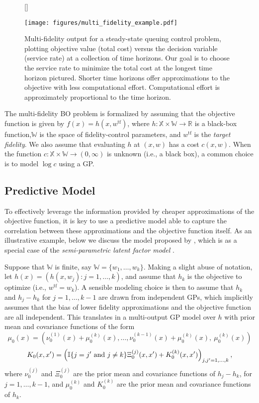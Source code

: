 \documentclass{wscpaperproc}
\newcommand{\R}{\mathbb{R}}
\newcommand{\X}{\mathbb{X}}
\newcommand{\W}{\mathbb{W}}
\theoremstyle{wsc}
\begin{document}
\begin{figure}[h]
[\FBwidth]
{\caption{
Multi-fidelity output for a steady-state queuing control problem, plotting objective value (total cost) versus the decision variable (service rate) at a collection of time horizons. Our goal is to choose the service rate to minimize the total cost at the longest time horizon pictured. Shorter time horizons offer approximations to the objective with less computational effort. Computational effort is approximately proportional to the time horizon.
\label{fig:mf_example}
}\label{fig:test}}
{\texttt{[image: figures/multi\_fidelity\_example.pdf]}}
\end{figure}

The multi-fidelity BO problem is formalized by assuming that the objective function is given by $f(x)=h(x,w^{\mathrm{tf}})$, where $h:\X\times\W\rightarrow\R$ is a black-box function,$\W$ is the space of fidelity-control parameters, and $w^{\mathrm{tf}}$ is the \textit{target fidelity}. We also assume that evaluating $h$ at $(x,w)$ has a cost $c(x,w)$. When the function $c:\X\times\W\rightarrow(0,\infty)$ is unknown (i.e., a black box), a common choice is to model $\log c$ using a GP.



\subsection{Predictive Model}
To effectively leverage the information provided by cheaper approximations of the objective function, it is key to use a predictive model  able to capture the correlation between these approximations and the objective function itself. As an illustrative example, below we discuss the model proposed by , which is as a special case of the \textit{semi-parametric latent factor model} .

Suppose that $\W$ is finite, say $\W=\{w_1,\ldots, w_k\}$. Making a slight abuse of notation, let $h(x)=\left(h(x,w_j):j=1,\ldots,k\right)$, and assume that $h_k$ is the objective to optimize (i.e., $w^\mathrm{tf} = w_k$). A sensible modeling choice is then to assume that $h_k$ and $h_j - h_k$ for $j=1,\ldots, k-1$ are drawn from independent GPs, which implicitly assumes that the bias of lower fidelity approximations and the objective function are all independent. This translates in a multi-output GP model over $h$ with prior mean and covariance functions of the form
\begin{equation*}
    \mu_0(x) = (\nu_0^{(1)}(x) + \mu_0^{(k)}(x), \ldots,  \nu_0^{(k-1)}(x) + \mu_0^{(k)}(x), \ \mu_0^{(k)}(x))
\end{equation*}
\begin{equation*}
    K_0(x,x') = \left(\mathbb{I}\{j=j' \textnormal{ and } j\neq k\}\Xi_0^{(j)}(x,x') + K_0^{(k)}(x,x')\right)_{j,j' = 1,\ldots, k},  
\end{equation*}
where $\nu_0^{(j)}$ and $\Xi_0^{(j)}$ are the prior mean and covariance functions of $h_j - h_k$, for $j=1,\ldots, k-1$, and $\mu_0^{(k)}$ and $K_0^{(k)}$ are the prior mean and covariance functions of $h_k$.
\end{document}
